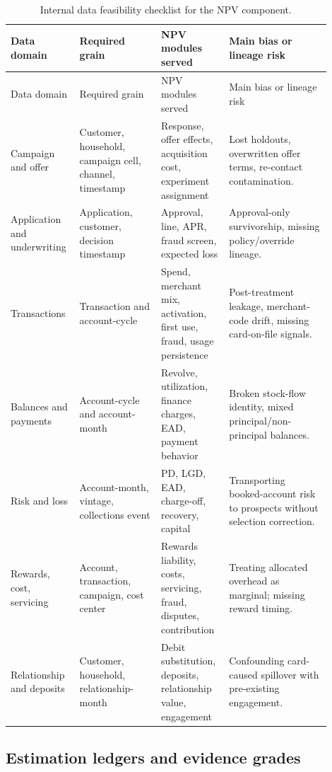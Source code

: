 \documentclass[11pt]{article}
\newcommand{\1}{\mathbf{1}}
\begin{document}
\begin{longtable}{L{0.18\linewidth}L{0.24\linewidth}L{0.18\linewidth}L{0.30\linewidth}}
\caption{Internal data feasibility checklist for the NPV component.}
\label{tab:internal-data-feasibility}\\
\toprule
Data domain & Required grain & NPV modules served & Main bias or lineage risk \\
\midrule
\endfirsthead
\toprule
Data domain & Required grain & NPV modules served & Main bias or lineage risk \\
\midrule
\endhead
Campaign and offer
  & Customer, household, campaign cell, channel, timestamp
  & Response, offer effects, acquisition cost, experiment assignment
  & Lost holdouts, overwritten offer terms, re-contact contamination. \\
Application and underwriting
  & Application, customer, decision timestamp
  & Approval, line, APR, fraud screen, expected loss
  & Approval-only survivorship, missing policy/override lineage. \\
Transactions
  & Transaction and account-cycle
  & Spend, merchant mix, activation, first use, fraud, usage persistence
  & Post-treatment leakage, merchant-code drift, missing card-on-file signals. \\
Balances and payments
  & Account-cycle and account-month
  & Revolve, utilization, finance charges, EAD, payment behavior
  & Broken stock-flow identity, mixed principal/non-principal balances. \\
Risk and loss
  & Account-month, vintage, collections event
  & PD, LGD, EAD, charge-off, recovery, capital
  & Transporting booked-account risk to prospects without selection correction. \\
Rewards, cost, servicing
  & Account, transaction, campaign, cost center
  & Rewards liability, costs, servicing, fraud, disputes, contribution
  & Treating allocated overhead as marginal; missing reward timing. \\
Relationship and deposits
  & Customer, household, relationship-month
  & Debit substitution, deposits, relationship value, engagement
  & Confounding card-caused spillover with pre-existing engagement. \\
\bottomrule
\end{longtable}

\subsection{Estimation ledgers and evidence grades}
\end{document}
